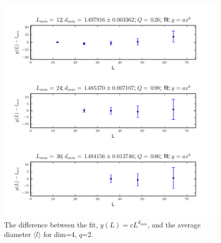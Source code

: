 \documentclass[pre,preprint]{revtex4}
\newcommand{\lb}{{\langle}}
\newcommand{\rb}{{\rangle}}
\begin{document}

\begin{figure}[htp]
\centering
\includegraphics[width=.9\textwidth]{figures/d_min_D4q2_46_fig}
\caption{The difference between the fit, $y(L)=cL^{d_{min}}$, and the average diameter $\lb l \rb$ for dim=4, $q$=2.}\label{fig:4}
\end{figure}
\end{document}
